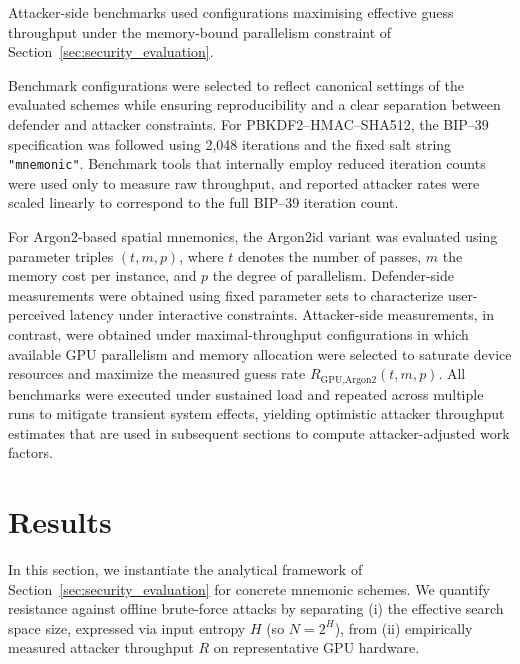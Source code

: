 \documentclass[journal,article,accept,pdftex,moreauthors]{Definitions/mdpi}
\begin{document}
Attacker-side benchmarks used configurations maximising effective guess throughput under the memory-bound parallelism constraint of Section~\ref{sec:security_evaluation}.

Benchmark configurations were selected to reflect canonical settings of the evaluated schemes while ensuring reproducibility and a clear separation between defender and attacker constraints. For PBKDF2--HMAC--SHA512, the BIP--39 specification was followed using 2,048 iterations and the fixed salt string \texttt{"mnemonic"}. Benchmark tools that internally employ reduced iteration counts were used only to measure raw throughput, and reported attacker rates were scaled linearly to correspond to the full BIP--39 iteration count.

For Argon2-based spatial mnemonics, the Argon2id variant was evaluated using parameter triples $(t,m,p)$, where $t$ denotes the number of passes, $m$ the memory cost per instance, and $p$ the degree of parallelism. Defender-side measurements were obtained using fixed parameter sets to characterize user-perceived latency under interactive constraints. Attacker-side measurements, in contrast, were obtained under maximal-throughput configurations in which available GPU parallelism and memory allocation were selected to saturate device resources and maximize the measured guess rate $R_{\text{GPU,Argon2}}(t,m,p)$. All benchmarks were executed under sustained load and repeated across multiple runs to mitigate transient system effects, yielding optimistic attacker throughput estimates that are used in subsequent sections to compute attacker-adjusted work factors.





\section{Results}
\label{sec:results}


In this section, we instantiate the analytical framework of Section~\ref{sec:security_evaluation} for concrete mnemonic schemes. We quantify resistance against offline brute-force attacks by separating (i) the effective search space size, expressed via input entropy $H$ (so $N = 2^{H}$), from (ii) empirically measured attacker throughput $R$ on representative GPU hardware.


\end{document}
